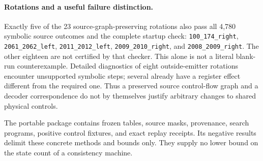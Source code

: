 \paragraph{Rotations and a useful failure distinction.}
Exactly five of the 23 source-graph-preserving rotations also pass all
4,780 symbolic source outcomes and the complete startup check:
\texttt{100\_174\_right}, \texttt{2061\_2062\_left},
\texttt{2011\_2012\_left}, \texttt{2009\_2010\_right}, and
\texttt{2008\_2009\_right}.
The other eighteen are not certified by that checker. This alone is not
a literal blank-run counterexample. Detailed diagnostics of eight
outside-emitter rotations encounter unsupported symbolic steps; several
already have a register effect different from the required one. Thus a
preserved source control-flow graph and a decoder correspondence do not
by themselves justify arbitrary changes to shared physical controls.

The portable package contains frozen tables, source masks, provenance,
search programs, positive control fixtures, and exact replay receipts.
Its negative results delimit these concrete methods and bounds only.
They supply no lower bound on the state count of a consistency machine.

